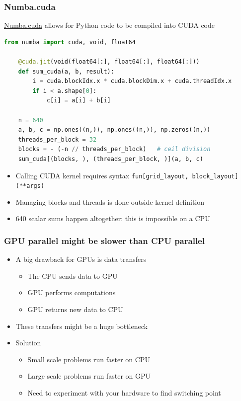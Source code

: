 \documentclass[10pt, aspectratio=1610]{beamer}
\begin{document}
\begin{frame}[fragile]
  \frametitle{Numba.cuda}

  \href{https://numba.pydata.org/numba-doc/dev/cuda/index.html}{Numba.cuda} allows for Python code to be compiled into CUDA code

  \vfill

  \begin{lstlisting}[language=python]
    from numba import cuda, void, float64

    @cuda.jit(void(float64[:], float64[:], float64[:]))
    def sum_cuda(a, b, result):
        i = cuda.blockIdx.x * cuda.blockDim.x + cuda.threadIdx.x
        if i < a.shape[0]:
            c[i] = a[i] + b[i]

    n = 640
    a, b, c = np.ones((n,)), np.ones((n,)), np.zeros((n,))
    threads_per_block = 32
    blocks = - (-n // threads_per_block)   # ceil division
    sum_cuda[(blocks, ), (threads_per_block, )](a, b, c)
  \end{lstlisting}

  \vfill

  \begin{itemize}
    \item Calling CUDA kernel requires syntax \lstinline{fun[grid_layout, block_layout](**args)}
    \item Managing blocks and threads is done outside kernel definition
    \item 640 scalar sums happen altogether: this is impossible on a CPU
  \end{itemize}

\end{frame}

\begin{frame}
  \frametitle{GPU parallel might be slower than CPU parallel}

  \begin{itemize}
    \item A big drawback for GPUs is data transfers
      \begin{itemize}
        \item The CPU sends data to GPU
        \item GPU performs computations
        \item GPU returns new data to CPU
      \end{itemize}
    \item These transfers might be a huge bottleneck
    \item Solution
      \begin{itemize}
        \item Small scale problems run faster on CPU
        \item Large scale problems run faster on GPU
        \item Need to experiment with your hardware to find switching point
      \end{itemize}
  \end{itemize}

\end{frame}
\end{document}
